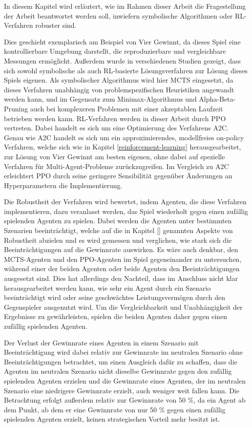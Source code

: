 \label{konzept}

In diesem Kapitel wird erläutert, wie im Rahmen dieser Arbeit die Fragestellung der Arbeit beantwortet werden soll, inwiefern symbolische Algorithmen oder RL-Verfahren robuster sind.

Dies geschieht exemplarisch am Beispiel von Vier Gewinnt, da dieses Spiel eine kontrollierbare Umgebung darstellt, die reproduzierbare und vergleichbare Messungen ermöglicht. Außerdem wurde in verschiedenen Studien gezeigt, dass sich sowohl symbolische als auch RL-basierte Lösungsverfahren zur Lösung dieses Spiels eigenen. Als symbolischer Algorithmus wird hier MCTS eingesetzt, da dieses Verfahren unabhängig von problemspezifischen Heuristiken angewandt werden kann, und im Gegensatz zum Minimax-Algorithmus und Alpha-Beta-Pruning auch bei komplexeren Problemen mit einer akzeptablen Laufzeit betrieben werden kann. RL-Verfahren werden in dieser Arbeit durch PPO vertreten. Dabei handelt es sich um eine Optimierung des Verfahrens A2C. Genau wie A2C handelt es sich um ein approximierendes, modellfreies on-policy Verfahren, welche sich wie in Kapitel \ref{reinforcement-learning} herausgearbeitet, zur Lösung von Vier Gewinnt am besten eigenen, ohne dabei auf spezielle Verfahren für Multi-Agent-Probleme zurückzugreifen. Im Vergleich zu A2C erleichtert PPO durch seine geringere Sensibilität gegenüber Änderungen an Hyperparametern die Implementierung.

Die Robustheit der Verfahren wird bewertet, indem Agenten, die diese Verfahren implementieren, dazu veranlasst werden, das Spiel wiederholt gegen einen zufällig spielenden Agenten zu spielen. Dabei werden die Agenten unter bestimmten Szenarien beeinträchtigt, welche auf die in Kapitel \ref{} genannten Aspekte von Robustheit abzielen und es wird gemessen und verglichen, wie stark sich die Beeinträchtigungen auf die Gewinnrate auswirken. Es wäre auch denkbar, den MCTS-Agenten und den PPO-Agenten im Spiel gegeneinander zu untersuchen, während einer der beiden Agenten oder beide Agenten den Beeinträchtigungen ausgesetzt sind. Dies hat allerdings den Nachteil, dass im Anschluss nicht klar herausgearbeitet werden kann, wie sehr ein Agent durch ein Szenario beeinträchtigt wird oder seine geschwächtes Leistungsvermögen durch den Gegenspieler ausgenutzt wird. Um die Vergleichbarkeit und Unabhängigkeit der Ergebnisse zu gewährleisten, spielen die beiden Agenten daher gegen einen zufällig spielenden Agenten.

Der Verlust der Gewinnrate eines Agenten in einem Szenario mit Beeinträchtigung wird dabei relativ zur Gewinnrate im neutralen Szenario ohne Beeinträchtigungen betrachtet, um einen Ausgleich dafür zu schaffen, dass die Agenten im neutralen Szenario nicht dieselbe Gewinnrate gegen den zufällig spielenden Agenten erzielen und die Gewinnrate eines Agenten, der im neutralen Szenario eine niedrigere Gewinnrate erzielt, auch weniger weit fallen kann. Die Betrachtung erfolgt außerdem relativ zur Gewinnrate von 50 \%, da ein Agent ab dem Punkt, ab dem er eine Gewinnrate von nur 50 \% gegen einen zufällig spielenden Agenten erzielt, keinen strategischen Vorteil mehr besitzt ist.

